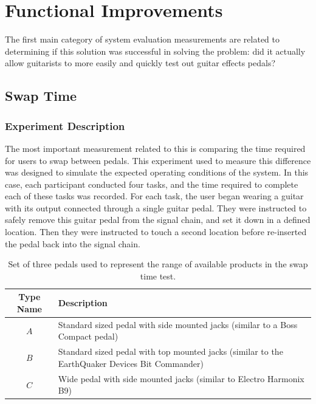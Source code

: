 \section{Functional Improvements}

The first main category of system evaluation measurements are related to determining if this solution was successful in solving the problem: did it actually allow guitarists to more easily and quickly test out guitar effects pedals?  

	\subsection{Swap Time}
		\subsubsection{Experiment Description}
		The most important measurement related to this is comparing the time required for users to swap between pedals.  This experiment used to measure this difference was designed to simulate the expected operating conditions of the system.  In this case, each participant conducted four tasks, and the time required to complete each of these tasks was recorded.  For each task, the user began wearing a guitar with its output connected through a single guitar pedal.  They were instructed to safely remove this guitar pedal from the signal chain, and set it down in a defined location.  Then they were instructed to touch a second location before re-inserted the pedal back into the signal chain.




		\begin{table}
		\begin{center}
		\begin{tabular}{ |c|p{8cm}| }
		\hline
		Type Name & Description \\ 
		\hline
		$A$ & Standard sized pedal with side mounted jacks (similar to a Boss Compact pedal) \\
		$B$ & Standard sized pedal with top mounted jacks (similar to the EarthQuaker Devices Bit Commander) \\
		$C$ & Wide pedal with side mounted jacks (similar to Electro Harmonix B9) \\
		\hline
		\end{tabular}
		\caption{Set of three pedals used to represent the range of available products in the swap time test.}
		\label{tab:swaptest_pedals} 
		\end{center}
		\end{table}


